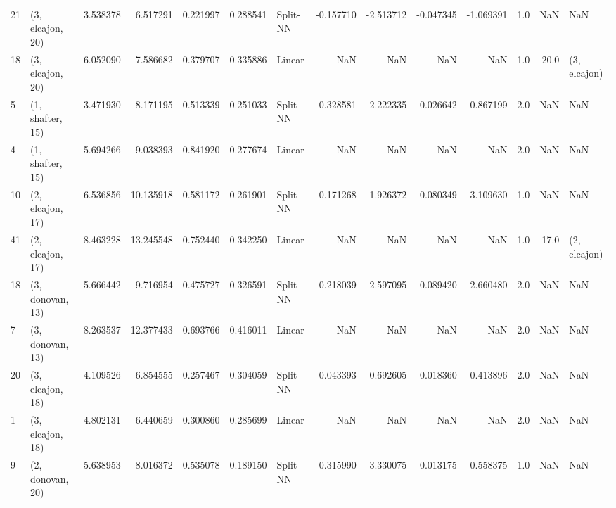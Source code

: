 \begin{tabular}{llrrrrlrrrrrrl}
21 &  (3, elcajon, 20) &   3.538378 &   6.517291 &   0.221997 &  0.288541 &    Split-NN &       -0.157710 &     -2.513712 &      -0.047345 &    -1.069391 &            1.0 &    NaN &              NaN \\
18 &  (3, elcajon, 20) &   6.052090 &   7.586682 &   0.379707 &  0.335886 &      Linear &             NaN &           NaN &            NaN &          NaN &            1.0 &   20.0 &     (3, elcajon) \\
5  &  (1, shafter, 15) &   3.471930 &   8.171195 &   0.513339 &  0.251033 &    Split-NN &       -0.328581 &     -2.222335 &      -0.026642 &    -0.867199 &            2.0 &    NaN &              NaN \\
4  &  (1, shafter, 15) &   5.694266 &   9.038393 &   0.841920 &  0.277674 &      Linear &             NaN &           NaN &            NaN &          NaN &            2.0 &    NaN &              NaN \\
10 &  (2, elcajon, 17) &   6.536856 &  10.135918 &   0.581172 &  0.261901 &    Split-NN &       -0.171268 &     -1.926372 &      -0.080349 &    -3.109630 &            1.0 &    NaN &              NaN \\
41 &  (2, elcajon, 17) &   8.463228 &  13.245548 &   0.752440 &  0.342250 &      Linear &             NaN &           NaN &            NaN &          NaN &            1.0 &   17.0 &     (2, elcajon) \\
18 &  (3, donovan, 13) &   5.666442 &   9.716954 &   0.475727 &  0.326591 &    Split-NN &       -0.218039 &     -2.597095 &      -0.089420 &    -2.660480 &            2.0 &    NaN &              NaN \\
7  &  (3, donovan, 13) &   8.263537 &  12.377433 &   0.693766 &  0.416011 &      Linear &             NaN &           NaN &            NaN &          NaN &            2.0 &    NaN &              NaN \\
20 &  (3, elcajon, 18) &   4.109526 &   6.854555 &   0.257467 &  0.304059 &    Split-NN &       -0.043393 &     -0.692605 &       0.018360 &     0.413896 &            2.0 &    NaN &              NaN \\
1  &  (3, elcajon, 18) &   4.802131 &   6.440659 &   0.300860 &  0.285699 &      Linear &             NaN &           NaN &            NaN &          NaN &            2.0 &    NaN &              NaN \\
9  &  (2, donovan, 20) &   5.638953 &   8.016372 &   0.535078 &  0.189150 &    Split-NN &       -0.315990 &     -3.330075 &      -0.013175 &    -0.558375 &            1.0 &    NaN &              NaN \\

\end{tabular}
